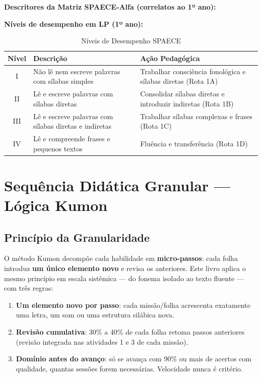 \textbf{Descritores da Matriz SPAECE-Alfa (correlatos ao 1º ano):}

\spaecealfa

\textbf{Níveis de desempenho em LP (1º ano):}

\begin{table}[h]
\centering
\caption{Níveis de Desempenho SPAECE}
\begin{tabular}{|c|p{5cm}|p{5cm}|}
\hline
\textbf{Nível} & \textbf{Descrição} & \textbf{Ação Pedagógica} \\
\hline
I & Não lê nem escreve palavras com sílabas simples & Trabalhar consciência fonológica e sílabas diretas (Rota 1A) \\
\hline
II & Lê e escreve palavras com sílabas diretas & Consolidar sílabas diretas e introduzir indiretas (Rota 1B) \\
\hline
III & Lê e escreve palavras com sílabas diretas e indiretas & Trabalhar sílabas complexas e frases (Rota 1C) \\
\hline
IV & Lê e compreende frases e pequenos textos & Fluência e transferência (Rota 1D) \\
\hline
\end{tabular}
\end{table}


\chapter{Sequência Didática Granular --- Lógica Kumon}

\section{Princípio da Granularidade}

O método Kumon decompõe cada habilidade em \textbf{micro-passos}: cada folha
introduz \textbf{um único elemento novo} e revisa os anteriores. Este livro
aplica o mesmo princípio em escala sistêmica --- do fonema isolado ao texto
fluente --- com três regras:

\begin{enumerate}[leftmargin=2cm]
  \item \textbf{Um elemento novo por passo}: cada missão/folha acrescenta
        exatamente uma letra, um som ou uma estrutura silábica nova.
  \item \textbf{Revisão cumulativa}: 30\% a 40\% de cada folha retoma passos
        anteriores (revisão integrada nas atividades 1 e 3 de cada missão).
  \item \textbf{Domínio antes do avanço}: só se avança com 90\% ou mais de
        acertos com qualidade, quantas sessões forem necessárias. Velocidade
        nunca é critério.
\end{enumerate}

